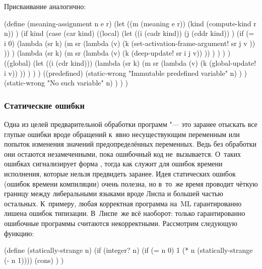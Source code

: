 Присваивание аналогично:

\begin{code:lisp}
(define (meaning-assignment n e r)
  (let ((m (meaning e r))
        (kind (compute-kind r n)) )
    (if kind
        (case (car kind)
          ((local)
           (let ((i (cadr kind))
                 (j (cddr kind)) )
             (if (= i 0)
                 (lambda (sr k)
                   (m sr (lambda (v)
                           (k (set-activation-frame-argument!
                               sr j v )) )) )
                 (lambda (sr k)
                   (m sr (lambda (v)
                           (k (deep-update! sr i j v)) )) ) ) ) )
          ((global)
           (let ((i (cdr kind)))
             (lambda (sr k)
               (m sr (lambda (v)
                       (k (global-update! i v)) )) ) ) )
          ((predefined)
           (static-wrong "Immutable predefined variable" n) ) )
        (static-wrong "No such variable" n) ) ) )
\end{code:lisp}


\subsubsection{Статические ошибки}\label{fast/fast/classify/sssect:static-err}

Одна из целей предварительной обработки программ "--- это заранее отыскать все
глупые ошибки вроде обращений к~явно несуществующим переменным или попыток
изменения значений предопределённых переменных. Ведь без обработки они остаются
незамеченными, пока ошибочный код не~вызывается. О~таких ошибках сигнализирует
форма , тогда как  служит для ошибок времени
исполнения, которые нельзя предвидеть заранее. Идея статических ошибок (ошибок
времени компиляции) очень полезна, но в~то~же время проводит чёткую границу
между либеральными языками вроде Лиспа и большей частью остальных. К~примеру,
любая корректная программа на~ML гарантированно лишена ошибок типизации.
В~Лиспе~же всё наоборот: только гарантированно ошибочные программы считаются
некорректными. Рассмотрим следующую функцию:

\begin{code:lisp}
(define (statically-strange n)
  (if (integer? n)
      (if (= n 0) 1 (* n (statically-strange (- n 1))))
      (cons) ) )
\end{code:lisp}


